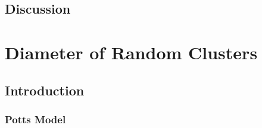 \documentclass[11pt]{article}
\begin{document}
\subsection{Discussion}
\label{sec-3.4}

\section{Diameter of Random Clusters}
\label{sec-4}

\subsection{Introduction}
\label{sec-4.1}

\subsubsection{Potts Model \cite{Wu82}}
\label{sec-4.1.1}
\end{document}
